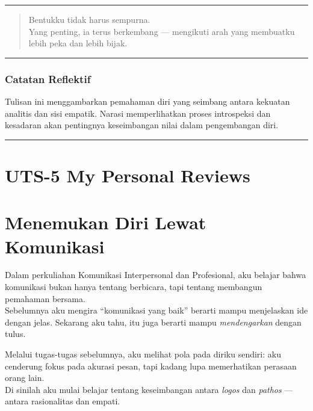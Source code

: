 \documentclass[
  letterpaper,
  DIV=11,
  numbers=noendperiod]{scrreprt}
\begin{document}
\begin{center}\rule{0.5\linewidth}{0.5pt}\end{center}

\begin{quote}
Bentukku tidak harus sempurna.\\
Yang penting, ia terus berkembang --- mengikuti arah yang membuatku
lebih peka dan lebih bijak.
\end{quote}

\begin{center}\rule{0.5\linewidth}{0.5pt}\end{center}

\subsection{Catatan Reflektif}\label{catatan-reflektif-2}

Tulisan ini menggambarkan pemahaman diri yang seimbang antara kekuatan
analitis dan sisi empatik. Narasi memperlihatkan proses introspeksi dan
kesadaran akan pentingnya keseimbangan nilai dalam pengembangan diri.

\begin{center}\rule{0.5\linewidth}{0.5pt}\end{center}


\chapter{UTS-5 My Personal Reviews}\label{uts-5-my-personal-reviews}


\chapter{Menemukan Diri Lewat
Komunikasi}\label{menemukan-diri-lewat-komunikasi}

Dalam perkuliahan Komunikasi Interpersonal dan Profesional, aku belajar
bahwa komunikasi bukan hanya tentang berbicara, tapi tentang membangun
pemahaman bersama.\\
Sebelumnya aku mengira ``komunikasi yang baik'' berarti mampu
menjelaskan ide dengan jelas. Sekarang aku tahu, itu juga berarti mampu
\emph{mendengarkan} dengan tulus.

Melalui tugas-tugas sebelumnya, aku melihat pola pada diriku sendiri:
aku cenderung fokus pada akurasi pesan, tapi kadang lupa memerhatikan
perasaan orang lain.\\
Di sinilah aku mulai belajar tentang keseimbangan antara \emph{logos}
dan \emph{pathos} --- antara rasionalitas dan empati.
\end{document}
